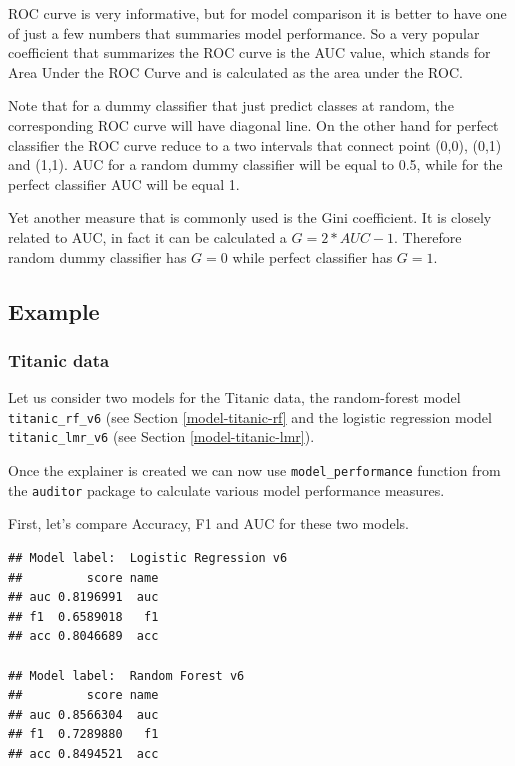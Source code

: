 \documentclass[12pt,]{krantz}
\begin{document}
ROC curve is very informative, but for model comparison it is better to have one of just a few numbers that summaries model performance. So a very popular coefficient that summarizes the ROC curve is the AUC value, which stands for Area Under the ROC Curve and is calculated as the area under the ROC.

Note that for a dummy classifier that just predict classes at random, the corresponding ROC curve will have diagonal line. On the other hand for perfect classifier the ROC curve reduce to a two intervals that connect point (0,0), (0,1) and (1,1). AUC for a random dummy classifier will be equal to 0.5, while for the perfect classifier AUC will be equal 1.

Yet another measure that is commonly used is the Gini coefficient. It is closely related to AUC, in fact it can be calculated a \(G = 2*AUC - 1\). Therefore random dummy classifier has \(G=0\) while perfect classifier has \(G=1\).

\hypertarget{example}{%
\subsection{Example}\label{example}}

\hypertarget{modelPerformanceTitanic}{%
\subsubsection{Titanic data}\label{modelPerformanceTitanic}}

Let us consider two models for the Titanic data, the random-forest model \texttt{titanic\_rf\_v6} (see Section \ref{model-titanic-rf} and the logistic regression model \texttt{titanic\_lmr\_v6} (see Section \ref{model-titanic-lmr}).

Once the explainer is created we can now use \texttt{model\_performance} function from the \texttt{auditor} package to calculate various model performance measures.

First, let's compare Accuracy, F1 and AUC for these two models.

\begin{verbatim}
## Model label:  Logistic Regression v6 
##         score name
## auc 0.8196991  auc
## f1  0.6589018   f1
## acc 0.8046689  acc

## Model label:  Random Forest v6 
##         score name
## auc 0.8566304  auc
## f1  0.7289880   f1
## acc 0.8494521  acc
\end{verbatim}
\end{document}

